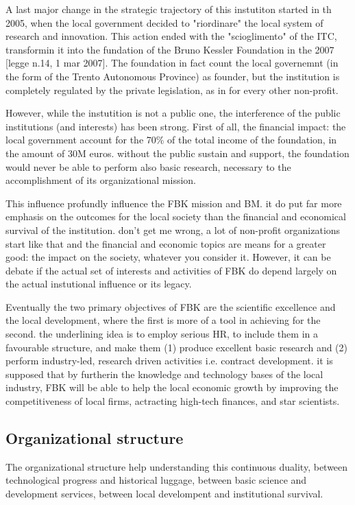 A last major change in the strategic trajectory of this instutiton started in th 2005, when the local government decided to "riordinare" the local system of research and innovation. This action ended with the "scioglimento" of the ITC, transformin it into the fundation of the Bruno Kessler Foundation in the 2007 [legge n.14, 1 mar 2007]. The foundation in fact count the local governemnt (in the form of the Trento Autonomous Province) as founder, but the institution is completely regulated by the private legislation, as in for every other non-profit. 

However, while the instutition is not a public one, the interference of the public institutions (and interests) has been strong. First of all, the financial impact: the local government account for the 70\% of the total income of the foundation, in the amount of 30M euros. without the public sustain and support, the foundation would never be able to perform also basic research, necessary to the accomplishment of its organizational mission.

This influence profundly influence the FBK mission and BM. it do put far more emphasis on the outcomes for the local society than the financial and economical survival of the institution. don't get me wrong, a lot of non-profit organizations start like that and the financial and economic topics are means for a greater good: the impact on the society, whatever you consider it. However, it can be debate if the actual set of interests and activities of FBK do depend largely on the actual instutional influence or its legacy.

Eventually the two primary objectives of FBK are the scientific excellence and the local development, where the first is more of a tool in achieving for the second. the underlining idea is to employ serious HR, to include them in a favourable structure, and make them (1) produce excellent basic research and (2) perform industry-led, research driven activities i.e. contract development. it is supposed that by furtherin the knowledge and technology bases of the local industry, FBK will be able to help the local economic growth by improving the competitiveness of local firms, actracting high-tech finances, and star scientists.

\subsection{Organizational structure}

The organizational structure help understanding this continuous duality, between technological progress and historical luggage, between basic science and development services, between local develompent and institutional survival.

